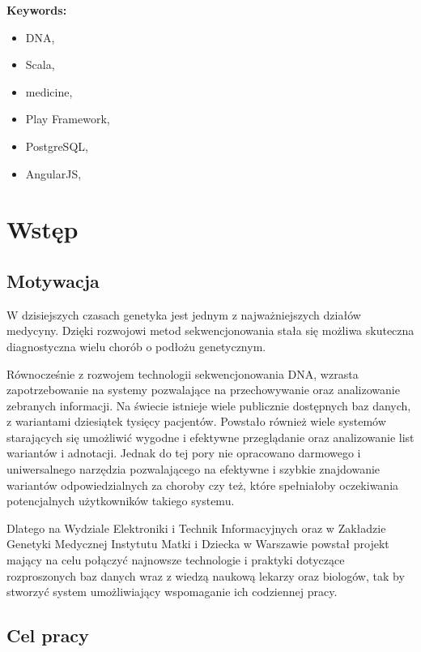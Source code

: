 \documentclass[a4paper,12pt,twoside]{article}
\begin{document}
\textbf{Keywords:}
\begin{itemize}
\item DNA,
\item Scala,
\item medicine,
\item Play Framework,
\item PostgreSQL,
\item AngularJS,
\end{itemize}
\newpage

\newpage
\tableofcontents

\newpage
\section{Wstęp}

\subsection{Motywacja}

W dzisiejszych czasach genetyka jest jednym z najważniejszych działów medycyny.
Dzięki rozwojowi metod sekwencjonowania stała się możliwa skuteczna diagnostyczna wielu chorób o podłożu genetycznym.

Równocześnie z rozwojem technologii sekwencjonowania DNA, wzrasta zapotrzebowanie
na systemy pozwalające na przechowywanie oraz analizowanie zebranych
informacji.
Na świecie istnieje wiele publicznie dostępnych baz danych,
z wariantami dziesiątek tysięcy pacjentów. Powstało również
wiele systemów starających się umożliwić wygodne i efektywne
przeglądanie oraz analizowanie list wariantów i adnotacji.
Jednak do tej pory nie opracowano darmowego i uniwersalnego narzędzia pozwalającego
na efektywne i szybkie znajdowanie
wariantów odpowiedzialnych za choroby czy też, które spełniałoby oczekiwania potencjalnych użytkowników takiego systemu.

Dlatego na Wydziale Elektroniki i Technik Informacyjnych
oraz w Zakładzie Genetyki Medycznej Instytutu Matki i Dziecka w Warszawie
powstał projekt mający na celu połączyć najnowsze technologie i
praktyki dotyczące rozproszonych baz danych wraz z wiedzą naukową
lekarzy oraz biologów, tak by stworzyć system umożliwiający
wspomaganie ich codziennej pracy.

\subsection{Cel pracy}
\end{document}

